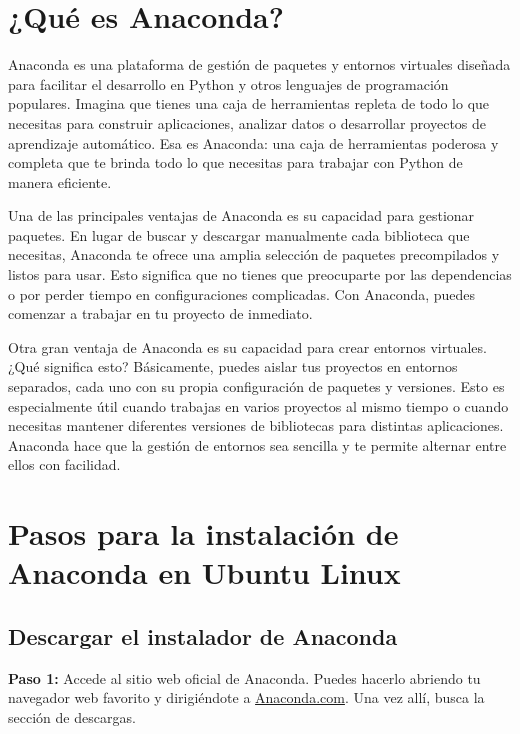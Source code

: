 \documentclass[
  jou,
  floatsintext,
  longtable,
  a4paper,
  nolmodern,
  notxfonts,
  notimes,
  colorlinks=true,linkcolor=blue,citecolor=blue,urlcolor=blue]{apa7}
\begin{document}
\section{¿Qué es Anaconda?}\label{quuxe9-es-anaconda}

Anaconda es una plataforma de gestión de paquetes y entornos virtuales
diseñada para facilitar el desarrollo en Python y otros lenguajes de
programación populares. Imagina que tienes una caja de herramientas
repleta de todo lo que necesitas para construir aplicaciones, analizar
datos o desarrollar proyectos de aprendizaje automático. Esa es
Anaconda: una caja de herramientas poderosa y completa que te brinda
todo lo que necesitas para trabajar con Python de manera eficiente.

Una de las principales ventajas de Anaconda es su capacidad para
gestionar paquetes. En lugar de buscar y descargar manualmente cada
biblioteca que necesitas, Anaconda te ofrece una amplia selección de
paquetes precompilados y listos para usar. Esto significa que no tienes
que preocuparte por las dependencias o por perder tiempo en
configuraciones complicadas. Con Anaconda, puedes comenzar a trabajar en
tu proyecto de inmediato.

Otra gran ventaja de Anaconda es su capacidad para crear entornos
virtuales. ¿Qué significa esto? Básicamente, puedes aislar tus proyectos
en entornos separados, cada uno con su propia configuración de paquetes
y versiones. Esto es especialmente útil cuando trabajas en varios
proyectos al mismo tiempo o cuando necesitas mantener diferentes
versiones de bibliotecas para distintas aplicaciones. Anaconda hace que
la gestión de entornos sea sencilla y te permite alternar entre ellos
con facilidad.

\section{Pasos para la instalación de Anaconda en Ubuntu
Linux}\label{pasos-para-la-instalaciuxf3n-de-anaconda-en-ubuntu-linux}

\subsection{Descargar el instalador de
Anaconda}\label{descargar-el-instalador-de-anaconda}

\textbf{Paso 1:} Accede al sitio web oficial de Anaconda. Puedes hacerlo
abriendo tu navegador web favorito y dirigiéndote a
\href{https://www.anaconda.com/}{Anaconda.com}. Una vez allí, busca la
sección de descargas.
\end{document}
